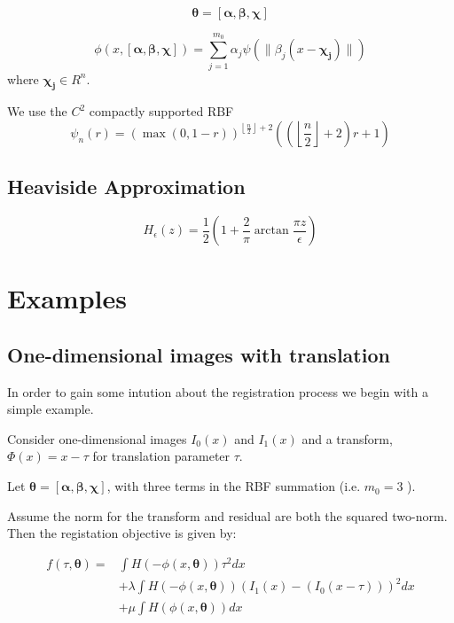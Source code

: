 \documentclass[]{article}
\newcommand{\vect}[1]{\boldsymbol{#1}}
\begin{document}
\begin{equation}
\vect{\theta} = [\vect{\alpha}, \vect{\beta}, \vect{\chi}]
\end{equation} 

\begin{equation}
\phi(x,[\vect{\alpha}, \vect{\beta}, \vect{\chi}]) = \sum_{j = 1}^{m_0} \alpha_j
\psi(\|\beta_j(x - \vect{\chi_j})\|) 
\end{equation}
where \( \vect{\chi_j} \in R^n\).
\par
We use the \(C^2\) compactly supported RBF
\begin{equation}
\psi_{n}(r) = \left ( \max{\left ( 0,1 - r \right )} \right )^{\left\lfloor
  \frac{n}{2}\right\rfloor + 2}\left ( \left ( \left\lfloor
  \frac{n}{2}\right\rfloor + 2 \right ) r+1 \right ) 
\end{equation}

\subsection{Heaviside Approximation}

\begin{equation}
H_\epsilon(z) = \frac{1}{2} \left (  1 + \frac{2}{\pi}
  \arctan{\frac{\pi z}{\epsilon}} \right )
\end{equation}

\section{Examples}

\subsection{One-dimensional images with translation }
In order to gain some intution about the registration process we begin
with a simple example.
\par
Consider one-dimensional images \(I_0(x)\) and \(I_1(x)\) and a
transform, \(\Phi(x) = x - \tau\) for translation parameter \(\tau\).
\par
Let \(\vect{\theta} = [\vect{\alpha}, \vect{\beta}, \vect{\chi}]\), with three terms in the RBF
summation (i.e. \(m_0 = 3\) ).
\par
Assume the norm for the transform and residual are both the squared two-norm.
Then the registation objective is given by:

\begin{eqnarray*}
f(\tau,\vect{\theta}) = & \int H(-\phi(x,\vect{\theta})) \tau^2 dx \\
& + \lambda \int H(-\phi(x,\vect{\theta}))\left (I_1(x) - (I_0(x-\tau)) \right )^2dx \\
& + \mu \int H(\phi(x,\vect{\theta})) dx
\end{eqnarray*}
\end{document}
